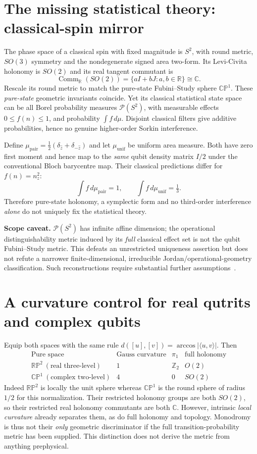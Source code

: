 \documentclass[10pt,letterpaper]{article}
\theoremstyle{plain}\newtheorem{theorem}{Theorem}\newtheorem{proposition}{Proposition}
\theoremstyle{definition}\newtheorem{remark}{Remark}
\begin{document}
\section{The missing statistical theory: classical-spin mirror}
The phase space of a classical spin with fixed magnitude is $S^2$, with round metric, $SO(3)$ symmetry and the nondegenerate signed area two-form. Its Levi-Civita holonomy is $SO(2)$ and its real tangent commutant is
\[
\operatorname{Comm}_{\mathbb R}(SO(2))=\{aI+bJ:a,b\in\mathbb R\}\cong\mathbb C.
\]
Rescale its round metric to match the pure-state Fubini--Study sphere $\mathbb{CP}^1$. These \emph{pure-state} geometric invariants coincide. Yet its classical statistical state space can be all Borel probability measures $\mathcal P(S^2)$, with measurable effects $0\le f(n)\le1$, and probability $\int f\,d\mu$. Disjoint classical filters give additive probabilities, hence no genuine higher-order Sorkin interference.

Define $\mu_{\mathrm{pair}}=\tfrac12(\delta_{\hat z}+\delta_{-\hat z})$ and let $\mu_{\mathrm{unif}}$ be uniform area measure. Both have zero first moment and hence map to the \emph{same} qubit density matrix $I/2$ under the conventional Bloch barycentre map. Their classical predictions differ for $f(n)=n_z^2$:
\[
\int f\,d\mu_{\mathrm{pair}}=1,
\qquad \int f\,d\mu_{\mathrm{unif}}=\tfrac13.
\]
Therefore pure-state holonomy, a symplectic form and no third-order interference \emph{alone} do not uniquely fix the statistical theory.

\textbf{Scope caveat.} $\mathcal P(S^2)$ has infinite affine dimension; the operational distinguishability metric induced by its \emph{full} classical effect set is not the qubit Fubini--Study metric. This defeats an unrestricted uniqueness assertion but does not refute a narrower finite-dimensional, irreducible Jordan/operational-geometry classification. Such reconstructions require substantial further assumptions~\cite{Barnum2014}.

\section{A curvature control for real qutrits and complex qubits}
Equip both spaces with the same rule $d([u],[v])=\arccos|\langle u,v\rangle|$. Then
\[
\begin{array}{c|c|c|c}
\text{Pure space} &\text{Gauss curvature}&\pi_1&\text{full holonomy}\\ \hline
\mathbb{RP}^{2}\ (\text{real three-level})&1&\mathbb Z_2&O(2)\\
\mathbb{CP}^{1}\ (\text{complex two-level})&4&0&SO(2)
\end{array}
\]
Indeed $\mathbb{RP}^2$ is locally the unit sphere whereas $\mathbb{CP}^1$ is the round sphere of radius $1/2$ for this normalization. Their restricted holonomy groups are both $SO(2)$, so their restricted real holonomy commutants are both $\mathbb C$. However, intrinsic \emph{local curvature} already separates them, as do full holonomy and topology. Monodromy is thus not their \emph{only} geometric discriminator if the full transition-probability metric has been supplied. This distinction does not derive the metric from anything prephysical.
\end{document}
